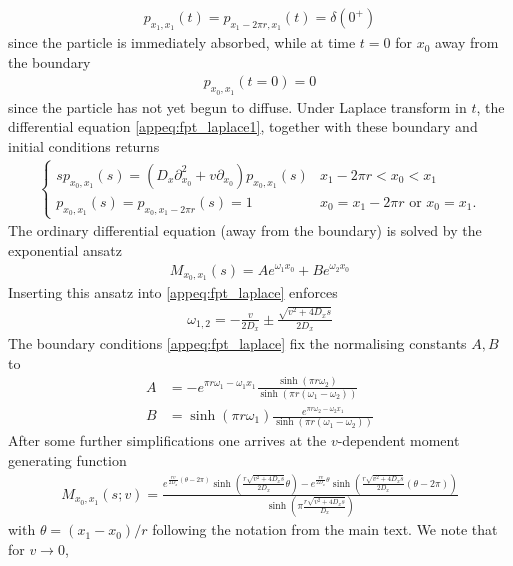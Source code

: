 \documentclass[%
 reprint,
superscriptaddress,
nofootinbib,
 amsmath,amssymb,
 aps,
prx,
]{revtex4-2}
\begin{document}
\begin{widetext}
\begin{align}
p_{x_1, x_1}( t)= p_{x_1-2\pi r, x_1}(t) = \delta(0^+)
\end{align}
since the particle is immediately absorbed, while at time $t=0$ for $x_0$ away from the boundary
\begin{align}
p_{x_0, x_1}( t=0) = 0 
\end{align}
since the particle has not yet begun to diffuse.
Under Laplace transform in $t$, the differential equation \eqref{appeq:fpt_laplace1}, together with these boundary and initial conditions returns
\begin{align}
\begin{cases}
s p_{x_0, x_1}( s) = (D_x \partial_{x_0}^2 + v \partial_{x_0})p_{x_0, x_1}( s) & x_1 - 2\pi r < x_0 < x_1 \\
p_{x_0, x_1}( s) =p_{x_0, x_1-2\pi r}( s)  = 1 & x_0 = x_1-2\pi r \text { or } x_0 = x_1.
\label{appeq:fpt_laplace}
\end{cases}
\end{align}
The ordinary differential equation (away from the boundary) is solved by the exponential ansatz
\begin{align}
	M_{x_0, x_1}(  s) = A e^{\omega_1 x_0} + B e^{\omega_2 x_0}
\end{align}
Inserting this ansatz into \eqref{appeq:fpt_laplace} enforces
\begin{align}
	\omega_{1,2} = - \frac{v}{2D_x} \pm \frac{\sqrt{v^2 + 4 D_x s}}{2D_x}
	\label{}
\end{align}
The boundary conditions \eqref{appeq:fpt_laplace} fix the normalising constants $A, B$ to  
\begin{align}
A&=-e^{\pi  r \omega_1-\omega_1 x_1} \frac{\sinh (\pi  r \omega_2) }{\sinh(\pi  r (\omega_1-\omega_2))}\\
B&=\sinh (\pi  r \omega_1) \frac{e^{\pi  r \omega_2-\omega_2 x_1} }{\sinh (\pi  r (\omega_1-\omega_2))}
\end{align}
After some further simplifications one arrives at the $v$-dependent moment generating function
\begin{align}
		M_{x_0, x_1 }( s; v)	
	=\frac{e^{ \frac{rv}{2D_x} \left( \theta - 2\pi \right) } \sinh\left( \frac{r\sqrt{v^2+4D_x s}}{2D_x} \theta \right) -e^{ \frac{rv}{2D_x}  \theta} \sinh\left( \frac{r\sqrt{v^2+4D_x s}}{2D_x} (\theta-2\pi) \right)}{\sinh\left( \pi\frac{r\sqrt{v^2 + 4D_x s}}{D_x} \right)}
	\label{eq:quenched_bmou_MGF_exact}
\end{align}
with $\theta = (x_1 - x_0)/r$ following the notation from the main text. We note that for $v \to 0$,

\end{widetext}
\end{document}
